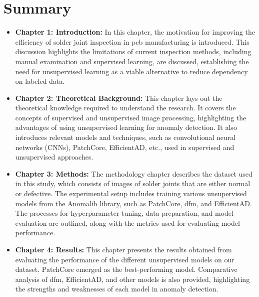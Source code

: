 \section{Summary}



\begin{itemize}
    \item \textbf{Chapter 1: Introduction:} In this chapter, the motivation for improving the efficiency of solder joint inspection in \gls{pcb} manufacturing is introduced. This discussion highlights the limitations of current inspection methods, including manual examination and supervised learning, are discussed, establishing the need for unsupervised learning as a viable alternative to reduce dependency on labeled data.

    \item \textbf{Chapter 2: Theoretical Background:} This chapter lays out the theoretical knowledge required to understand the research. It covers the concepts of supervised and unsupervised image processing, highlighting the advantages of using unsupervised learning for anomaly detection. It also introduces relevant models and techniques, such as convolutional neural networks (CNNs), PatchCore, EfficientAD, etc., used in supervised and unsupervised approaches.

    \item \textbf{Chapter 3: Methods:} The methodology chapter describes the dataset used in this study, which consists of images of solder joints that are either normal or defective. The experimental setup includes training various unsupervised models from the Anomalib library, such as PatchCore, \gls{dfm}, and EfficientAD. The processes for hyperparameter tuning, data preparation, and model evaluation are outlined, along with the metrics used for evaluating model performance.

    \item \textbf{Chapter 4: Results:} This chapter presents the results obtained from evaluating the performance of the different unsupervised models on our dataset. PatchCore emerged as the best-performing model. Comparative analysis of \gls{dfm}, EfficientAD, and other models is also provided, highlighting the strengths and weaknesses of each model in anomaly detection.


\end{itemize}
